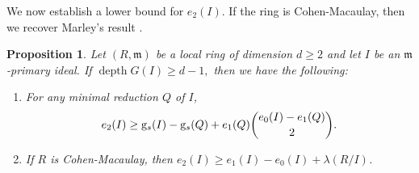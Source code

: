 \documentclass[reqno,a4paper,dvipsnames]{amsart}
\newcommand{\m}{\mathfrak{m} }
\newcommand{\depth}{\operatorname{depth}}
\newtheorem{proposition}[theorem]{Proposition}
\theoremstyle{definition}
\begin{document}
We  now establish a lower bound for $e_2(I)$. If the ring is  Cohen-Macaulay, then we recover Marley's result  \cite[Corollary~2(3)]{marley}.




 \begin{proposition} \label{newandfinalproofoflowerbound}
      Let $(R,\m)$ be a  local ring of dimension $d\geq 2$ and let $I$ be an $\m$-primary ideal.  If $\depth G(I) \geq d-1,$ then  we have the following:
 \begin{enumerate} [\normalfont (i)]
     \item 
     \label{newandfinalproofoflowerbound-1}
     For any minimal reduction $Q$ of $I$, 
      \begin{equation*} 
      e_{2}(I) \geq  \mathrm{g}_{s}(I)-\mathrm{g}_{s}(Q)+e_{1}(Q)\dbinom{e_{0}(I)-e_{1}(Q)}{2}.
       \end{equation*}
              \item 
       \label{newandfinalproofoflowerbound-2}
      \cite[Corollary~2(3)]{marley}
       If $R$ is Cohen-Macaulay, then 
       $e_{2}(I)\geq e_{1}(I)-e_{0}(I)+\lambda(R/I)$.    
 \end{enumerate}
 \end{proposition}
\end{document}
